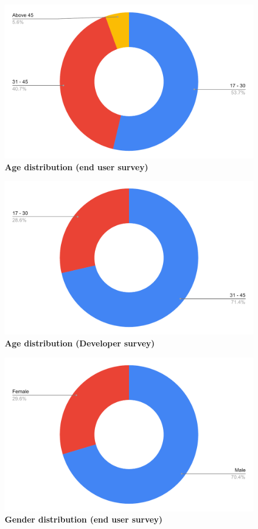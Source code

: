\begin{figure}[H]
  \centering
  \includegraphics[width=13cm]{thesis/paper/images/p2u_age.pdf}
  \textbf{Age distribution (end user survey)}
\end{figure}


\begin{figure}[H]
  \centering
  \includegraphics[width=13cm]{thesis/paper/images/p2d_age.pdf}
  \textbf{Age distribution (Developer survey)}
\end{figure}

\begin{figure}[H]
  \centering
  \includegraphics[width=13cm]{thesis/paper/images/p2u_gender.pdf}
  \textbf{Gender distribution (end user survey)}
\end{figure}


